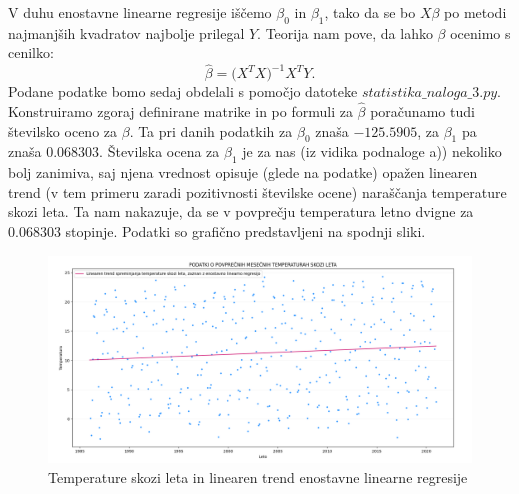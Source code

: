 \documentclass{article}
\begin{document}
V duhu enostavne linearne regresije iščemo $\beta_0$ in $\beta_1$, tako da se bo $X \beta$ po metodi najmanjših kvadratov najbolje prilegal $Y$.
Teorija nam pove, da lahko $\beta$ ocenimo s cenilko:
$$
    \hat{\beta} = \Big(X^{T}X\Big)^{-1}X^{T}Y.
$$
Podane podatke bomo sedaj obdelali s pomočjo datoteke $statistika\_naloga\_3.py$. 
Konstruiramo zgoraj definirane matrike in po formuli za $\hat{\beta}$ poračunamo tudi številsko oceno za $\beta$. Ta pri danih podatkih za $\beta_0$ znaša $-125.5905$, za $\beta_1$ pa znaša $0.068303$.
\newline
Številska ocena za $\beta_1$ je za nas (iz vidika podnaloge a)) nekoliko bolj zanimiva, saj njena vrednost opisuje (glede na podatke) opažen linearen trend (v tem primeru zaradi pozitivnosti številske ocene) naraščanja temperature skozi leta.
Ta nam nakazuje, da se v povprečju temperatura letno dvigne za $0.068303$ stopinje. 
Podatki so grafično predstavljeni na spodnji sliki. 
\begin{figure}[H]
    \begin{center}
    \includegraphics[width=\linewidth]{naloga3a.png}
    \vspace*{-5mm}\caption{Temperature skozi leta in linearen trend enostavne linearne regresije}
    \end{center}    
\end{figure}
\end{document}
